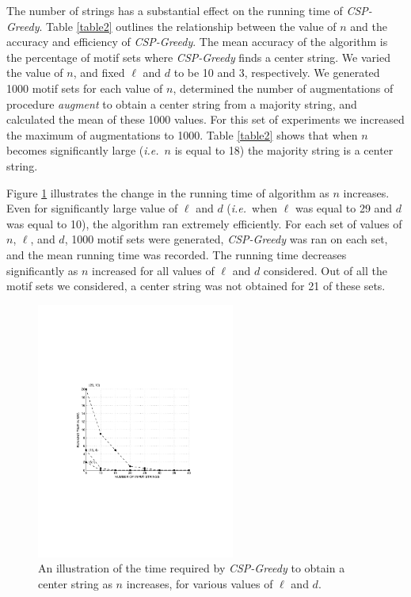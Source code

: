 The number of strings has a substantial effect on the running time of {\em CSP-Greedy}. Table \ref{table2} outlines the relationship between the value of $n$ and the accuracy and efficiency of {\em CSP-Greedy}. The mean accuracy of the algorithm is the percentage of motif sets where {\em CSP-Greedy} finds a center string.  We varied the value of $n$, and fixed $\ell$ and $d$ to be 10 and 3, respectively. We generated 1000 motif sets for each value of $n$, determined the number of augmentations of procedure {\em augment} to obtain a center string from a majority string, and calculated the mean of these 1000 values.  For this set of experiments we increased the maximum of augmentations to 1000.  Table \ref{table2} shows that when $n$ becomes significantly large ({\em i.e.}\ $n$ is equal to 18) the majority string is a center string.  
 
 
Figure \ref{fig:csp_greedy_plot_v2} illustrates the change in the running time of algorithm as $n$ increases.  Even for significantly large value of $\ell$ and $d$ ({\em i.e.}\ when $\ell$ was equal to 29 and $d$ was equal to 10), the algorithm ran extremely efficiently.  For each set of values of $n$, $\ell$, and $d$, 1000 motif sets were generated, {\em CSP-Greedy} was ran on each set, and the mean running time was recorded.  The running time decreases significantly as $n$ increased for all values of $\ell$ and $d$ considered.  Out of all the motif sets we considered, a center string was not obtained for 21 of these sets.   

\begin{figure}[h!]
\centering
\includegraphics[width=65mm,trim=7cm 8cm 7cm 7cm]{images/csp_greedy_running_v2}%
 \caption[An illustration of the time required by {\em CSP-Greedy} to obtain a center string as $n$ increases, for various values of $\ell$ and $d$.]{An illustration of the time required by {\em CSP-Greedy} to obtain a center string as $n$ increases, for various values of $\ell$ and $d$.}
\label{fig:csp_greedy_plot_v2}
\end{figure}

